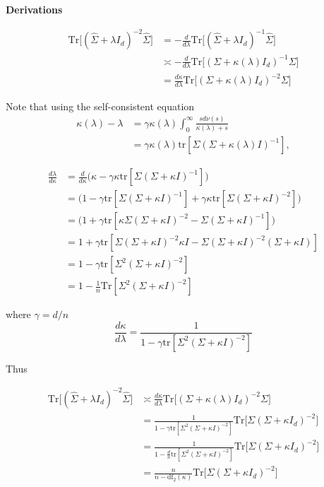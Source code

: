 \noindent\begin{minipage}[t]{1\columnwidth}%
\textbf{Derivations}

\begin{align*}
\mathrm{Tr}\Big[(\hat{\Sigma}+\lambda I_{d})^{-2}\hat{\Sigma}\Big] & =-\frac{d}{d\lambda}\mathrm{Tr}\Big[(\hat{\Sigma}+\lambda I_{d})^{-1}\hat{\Sigma}\Big]\\
 & \asymp-\frac{d}{d\lambda}\mathrm{Tr}\Big[(\Sigma+\kappa(\lambda)I_{d})^{-1}\Sigma\Big]\\
 & =\frac{d\kappa}{d\lambda}\mathrm{Tr}\Big[(\Sigma+\kappa(\lambda)I_{d})^{-2}\Sigma\Big]
\end{align*}

Note that using the self-consistent equation
\begin{align}
\kappa(\lambda)-\lambda & =\gamma\kappa(\lambda)\int_{0}^{\infty}\frac{sd\nu(s)}{\kappa(\lambda)+s}\label{eq:silverstein_self_consistent}\nonumber \\
 & =\gamma\kappa(\lambda)\mathrm{tr}[\Sigma(\Sigma+\kappa(\lambda)I)^{-1}],
\end{align}

\begin{align*}
\frac{d\lambda}{d\kappa} & =\frac{d}{d\kappa}\Big(\kappa-\gamma\kappa\mathrm{tr}[\Sigma(\Sigma+\kappa I)^{-1}]\Big)\\
 & =\Big(1-\gamma\mathrm{tr}[\Sigma(\Sigma+\kappa I)^{-1}]+\gamma\kappa\mathrm{tr}[\Sigma(\Sigma+\kappa I)^{-2}]\Big)\\
 & =\Big(1+\gamma\mathrm{tr}[\kappa\Sigma(\Sigma+\kappa I)^{-2}-\Sigma(\Sigma+\kappa I)^{-1}]\Big)\\
 & =1+\gamma\mathrm{tr}[\Sigma(\Sigma+\kappa I)^{-2}\kappa I-\Sigma(\Sigma+\kappa I)^{-2}(\Sigma+\kappa I)]\\
 & =1-\gamma\mathrm{tr}[\Sigma^{2}(\Sigma+\kappa I)^{-2}]\\
 & =1-\frac{1}{n}\mathrm{Tr}[\Sigma^{2}(\Sigma+\kappa I)^{-2}]
\end{align*}

where $\ensuremath{\gamma=d/n}$
\[
\frac{d\kappa}{d\lambda}=\frac{1}{1-\gamma\mathrm{tr}[\Sigma^{2}(\Sigma+\kappa I)^{-2}]}
\]

Thus

\begin{align*}
\mathrm{Tr}\Big[(\hat{\Sigma}+\lambda I_{d})^{-2}\hat{\Sigma}\Big] & \asymp\frac{d\kappa}{d\lambda}\mathrm{Tr}\Big[(\Sigma+\kappa(\lambda)I_{d})^{-2}\Sigma\Big]\\
 & =\frac{1}{1-\gamma\mathrm{tr}[\Sigma^{2}(\Sigma+\kappa I)^{-2}]}\mathrm{Tr}\Big[\Sigma(\Sigma+\kappa I_{d})^{-2}\Big]\\
 & =\frac{1}{1-\frac{d}{n}\mathrm{tr}[\Sigma^{2}(\Sigma+\kappa I)^{-2}]}\mathrm{Tr}\Big[\Sigma(\Sigma+\kappa I_{d})^{-2}\Big]\\
 & =\frac{n}{n-\mathrm{df}_{2}(\kappa)}\mathrm{Tr}\Big[\Sigma(\Sigma+\kappa I_{d})^{-2}\Big]
\end{align*}


\end{minipage}
